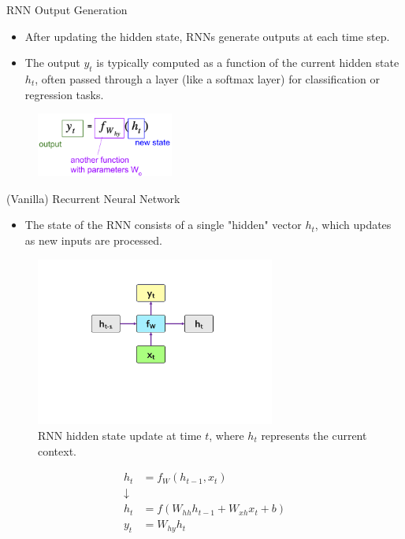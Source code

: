 \documentclass[serif, aspectratio=169]{beamer}
\begin{document}
\begin{frame}{RNN Output Generation}
	\begin{itemize}
		\item After updating the hidden state, RNNs generate outputs at each time step.
		\item The output \( y_t \) is typically computed as a function of the current hidden state \( h_t \), often passed through a layer (like a softmax layer) for classification or regression tasks.
	\end{itemize}
	\begin{figure}
		\centering
		\includegraphics[width=0.4\textwidth]{pic/RNN-out.png}
	\end{figure}
\end{frame}

\begin{frame}{(Vanilla) Recurrent Neural Network}
	\begin{itemize}
		\item The state of the RNN consists of a single "hidden" vector \( h_t \), which updates as new inputs are processed.
	\end{itemize}
	\vspace{-35pt}
	\begin{figure}
		\includegraphics[width=0.7\textwidth]{pic/RNN-final.png}
		\caption{RNN hidden state update at time \( t \), where \( h_t \) represents the current context.}
	\end{figure}
	\vspace{-100pt}
	\begin{align*}
		h_t &= f_W(h_{t-1}, x_t) \\ 
		\downarrow \\
		h_t &= f(W_{hh} h_{t-1} + W_{xh} x_t + b) \\ 
		y_t &= W_{hy} h_t
	\end{align*}
\end{frame}
\end{document}
